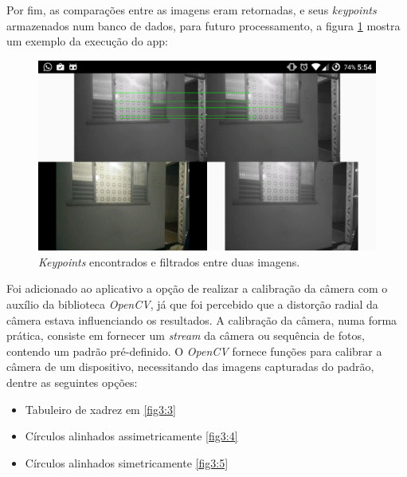 Por fim, as comparações entre as imagens eram retornadas, e seus \textit{keypoints} armazenados num banco de dados, para futuro processamento, a figura \ref{fig3:2} mostra um exemplo da execução do app:

\begin{figure}[!htb]
	\centering
		\includegraphics[width= \textwidth]{Imagens/figura3-2E4-4.png}
	\caption{\textit{Keypoints} encontrados e filtrados entre duas imagens.}
	\label{fig3:2}
\end{figure}

 
Foi adicionado ao aplicativo a opção de realizar a calibração da câmera com o auxílio da biblioteca \textit{OpenCV}, já que foi percebido que a distorção radial da câmera estava influenciando os resultados. A calibração da câmera, numa forma prática, consiste em fornecer um \textit{stream} da câmera ou sequência de fotos, contendo um padrão pré-definido. O \textit{OpenCV} fornece funções para calibrar a câmera de um dispositivo, necessitando das imagens capturadas do padrão, dentre as seguintes opções:

\begin{itemize}
	\item{Tabuleiro de xadrez em \ref{fig3:3}}
	\item{Círculos alinhados assimetricamente \ref{fig3:4}}
	\item{Círculos alinhados simetricamente \ref{fig3:5}}
\end{itemize}


